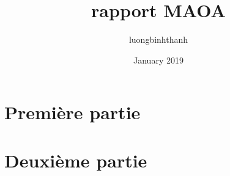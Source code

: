 \documentclass[12pt]{article}
\title{rapport MAOA}
\author{luongbinhthanh}
\date{January 2019}
\begin{document}

\tableofcontents
\newpage


\section{Première partie}



\section{Deuxième partie}



\end{document}
